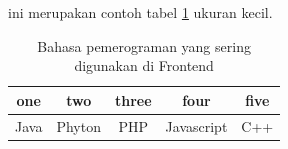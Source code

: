 ini merupakan contoh tabel \ref{table:contoh} ukuran kecil.
\begin{table}[h]
\caption{Bahasa pemerograman yang sering digunakan di Frontend}
\centering
\begin{tabular}{ccccc}
\hline
one&two&three&four&five\\
\hline
Java&Phyton&PHP&Javascript&C++\\
\hline
\end{tabular}
\label{table:contoh}
\end{table}



